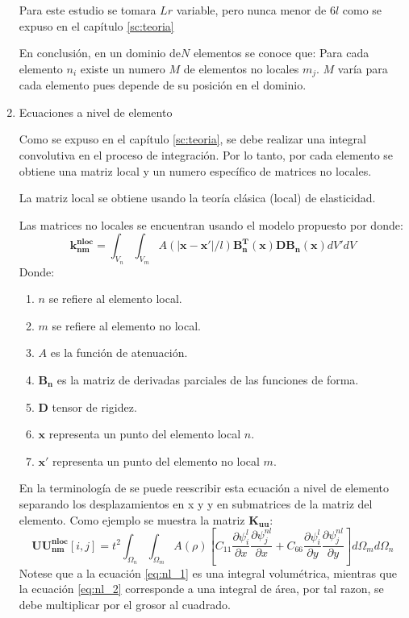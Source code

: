 \begin{enumerate}
				Para este estudio se tomara $Lr$ variable, pero nunca menor de $6l$ como se expuso en el capítulo \ref{sc:teoria}

				En conclusión, en un dominio de$N$ elementos se conoce que: Para cada elemento $n_i$ existe un numero $M$ de elementos no locales $m_j$. $M$ varía para cada elemento pues depende de su posición en el dominio.
				\item Ecuaciones a nivel de elemento

				Como se expuso en el capítulo \ref{sc:teoria}, se debe realizar una integral convolutiva en el proceso de integración. Por lo tanto, por cada elemento se obtiene una matriz local y un numero específico de matrices no locales.

				La matriz local se obtiene usando la teoría clásica (local) de elasticidad.

				Las matrices no locales se encuentran usando el modelo propuesto por \textcite{Pisano2009} donde:
				\begin{equation}
					\boldsymbol{k_{nm}^{nloc}}=\int_{V_n}\int_{V_m}{A(|\boldsymbol{x}-\boldsymbol{x'}|/l)\boldsymbol{B_n^T}(\boldsymbol{x})\boldsymbol{D}\boldsymbol{B_n}(\boldsymbol{x})}{dV'}{dV}
					\label{eq:nl_1}
				\end{equation}
				Donde:
				\begin{enumerate}
					\item[] $n$ se refiere al elemento local.
					\item[] $m$ se refiere al elemento no local.
					\item[] $A$ es la función de atenuación.
					\item[] $\boldsymbol{B_n}$ es la matriz de derivadas parciales de las funciones de forma.
					\item[] $\boldsymbol{D}$ tensor de rigidez.
					\item[] $\boldsymbol{x}$ representa un punto del elemento local $n$.
					\item[] $\boldsymbol{x'}$ representa un punto del elemento no local $m$.
				\end{enumerate}
				En la terminología de \textcite{Reddy} se puede reescribir esta ecuación a nivel de elemento separando los desplazamientos en x y y en submatrices de la matriz del elemento. Como ejemplo se muestra la matriz $\boldsymbol{K_{uu}}$:
				\begin{equation}
					\boldsymbol{UU_{nm}^{nloc}}[i,j]=t^2\int_{\Omega_n}\int_{\Omega_m}{A(\rho)\left[C_{11}\frac{\partial \psi_i^{l}}{\partial x}\frac{\partial \psi_j^{nl}}{\partial x}+C_{66}\frac{\partial \psi_i^{l}}{\partial y}\frac{\partial \psi_j^{nl}}{\partial y}\right]}{d\Omega_m}{d\Omega_n}
				\label{eq:nl_2}
				\end{equation}
				Notese que a la ecuación \ref{eq:nl_1} es una integral volumétrica, mientras que la ecuación \ref{eq:nl_2} corresponde a una integral de área, por tal razon, se debe multiplicar por el grosor al cuadrado.


\end{enumerate}
